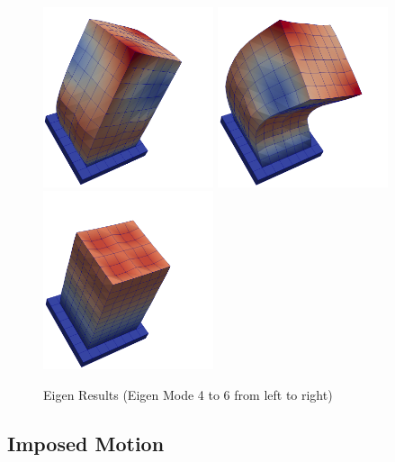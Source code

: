 \begin{figure}[H]
  \centering
  \includegraphics[width = 5cm]{./Figure-files/nonlinear_analysis_steps/structure/eigen/eigen4.png}
  \includegraphics[width = 5cm]{./Figure-files/nonlinear_analysis_steps/structure/eigen/eigen5.png}
  \includegraphics[width = 5cm]{./Figure-files/nonlinear_analysis_steps/structure/eigen/eigen6.png}
  \caption{Eigen Results (Eigen Mode 4 to 6 from left to right)}
  \label{fig_eigen_results_2}
\end{figure}




\clearpage
\newpage
\subsection{Imposed Motion}

